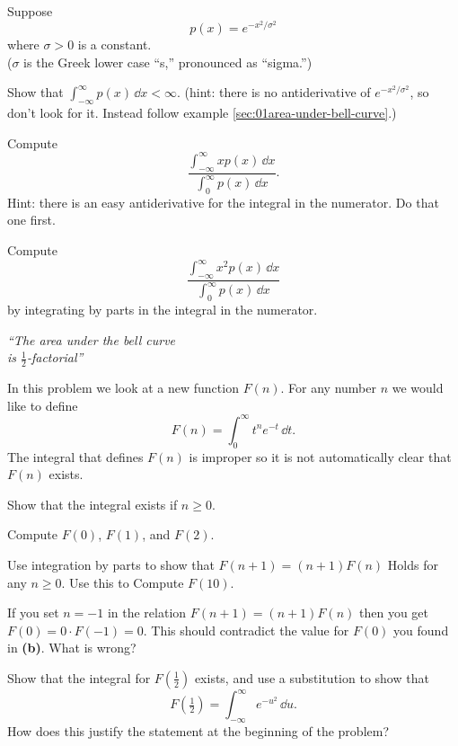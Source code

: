 \begin{multicols}{2}
\problem\groupproblem Suppose %
\[
p(x) = e^{-x^2/\sigma^2}
\]
where $\sigma>0$ is a constant.\\
{\footnotesize\sffamily($\sigma$ is the
Greek lower case ``s,'' pronounced as ``sigma.'')}

\subprob Show that $\int_{-\infty}^\infty p(x)\, \dd x<\infty$.  (hint:
 there is no antiderivative of $e^{-x^2/\sigma^2}$, so don't look for it.
Instead follow example \ref{sec:01area-under-bell-curve}.)

\subprob Compute
\[
\frac{\int_{-\infty}^\infty x p(x)\, \dd x} {\int_0^\infty p(x)\,\dd x}.
\]
Hint: there is an easy antiderivative for the integral in the numerator.  Do
that one first.

\subprob Compute
\[
\frac{\int_{-\infty}^\infty x^2 p(x)\, \dd x} {\int_0^\infty p(x)\,\dd x}
\]
by integrating by parts in the integral in the numerator.

\problem\groupproblem %

\begin{center}\itshape
  ``The area under the bell curve\\
  is $\frac12$-factorial''
\end{center}
In this problem we look at a new function $F(n)$.  For any number $n$ we
would like to define
\[
F(n) = \int_0^\infty t^n e^{-t}\,\dd t.
\]
The integral that defines $F(n)$ is improper so it is not automatically clear
that $F(n)$ exists.

\subprob Show that the integral exists if $n\geq0$.

\subprob Compute $F(0)$, $F(1)$, and $F(2)$.

\subprob Use integration by parts to show that $F(n+1) = (n+1) F(n)$ Holds for
any $n\geq 0$.  Use this to Compute $F(10)$.

\subprob  If you set $n=-1$ in the relation $F(n+1) = (n+1) F(n)$ then you get
$F(0) = 0\cdot F(-1) = 0$.  This should contradict the value for $F(0)$ you found
in \textbf{(b)}.  What is wrong?

\subprob Show that the integral for $F(\frac12)$ exists, and use a substitution
to show that
\[
F(\tfrac12) = \int_{-\infty}^\infty e^{-u^2} \,\dd u.
\]
How does this justify the statement at the beginning of the problem?


\end{multicols}
\noproblemfont

